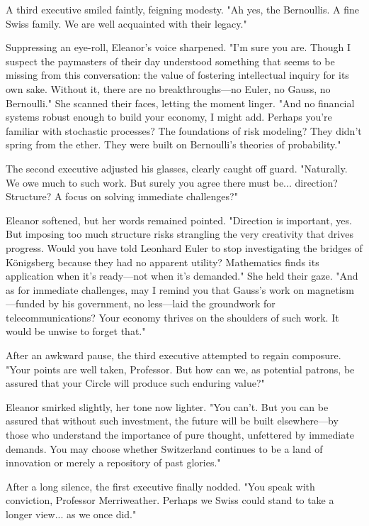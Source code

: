 A third executive smiled faintly, feigning modesty. "Ah yes, the Bernoullis. A fine Swiss family. We are well acquainted with their legacy."
\smallskip

Suppressing an eye-roll, Eleanor’s voice sharpened. "I'm sure you are. Though I suspect the paymasters of their day understood something that seems to be missing from this conversation: the value of fostering intellectual inquiry for its own sake. Without it, there are no breakthroughs—no Euler, no Gauss, no Bernoulli." She scanned their faces, letting the moment linger. "And no financial systems robust enough to build your economy, I might add. Perhaps you’re familiar with stochastic processes? The foundations of risk modeling? They didn’t spring from the ether. They were built on Bernoulli’s theories of probability."
\smallskip

The second executive adjusted his glasses, clearly caught off guard. "Naturally. We owe much to such work. But surely you agree there must be... direction? Structure? A focus on solving immediate challenges?"
\smallskip

Eleanor softened, but her words remained pointed. "Direction is important, yes. But imposing too much structure risks strangling the very creativity that drives progress. Would you have told Leonhard Euler to stop investigating the bridges of Königsberg because they had no apparent utility? Mathematics finds its application when it’s ready—not when it’s demanded." She held their gaze. "And as for immediate challenges, may I remind you that Gauss’s work on magnetism—funded by his government, no less—laid the groundwork for telecommunications? Your economy thrives on the shoulders of such work. It would be unwise to forget that."
\smallskip

After an awkward pause, the third executive attempted to regain composure. "Your points are well taken, Professor. But how can we, as potential patrons, be assured that your Circle will produce such enduring value?"
\smallskip

Eleanor smirked slightly, her tone now lighter. "You can’t. But you can be assured that without such investment, the future will be built elsewhere—by those who understand the importance of pure thought, unfettered by immediate demands. You may choose whether Switzerland continues to be a land of innovation or merely a repository of past glories."
\smallskip

After a long silence, the first executive finally nodded. "You speak with conviction, Professor Merriweather. Perhaps we Swiss could stand to take a longer view... as we once did."

